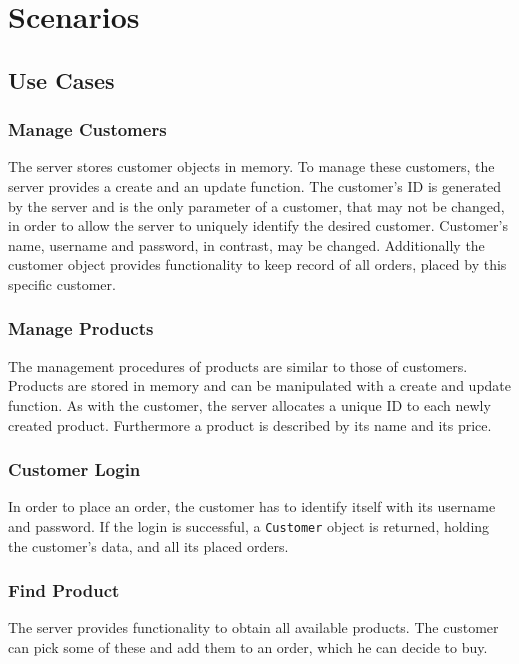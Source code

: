 \documentclass[a4paper]{article}
\begin{document}
\newpage



\section{Scenarios}

\subsection{Use Cases}

\subsubsection{Manage Customers}
The server stores customer objects in memory. To manage these customers, the server provides a create and an update function. The customer's ID is generated by the server and is the only parameter of a customer, that may not be changed, in order to allow the server to uniquely identify the desired customer. Customer's name, username and password, in contrast, may be changed. Additionally the customer object provides functionality to keep record of all orders, placed by this specific customer.

\subsubsection{Manage Products}
The management procedures of products are similar to those of customers. Products are stored in memory and can be manipulated with a create and update function. As with the customer, the server allocates a unique ID to each newly created product. Furthermore a product is described by its name and its price.

\subsubsection{Customer Login}
In order to place an order, the customer has to identify itself with its username and password. If the login is successful, a \texttt{Customer} object is returned, holding the customer's data, and all its placed orders.

\subsubsection{Find Product}
The server provides functionality to obtain all available products. The customer can pick some of these and add them to an order, which he can decide to buy.
\end{document}

